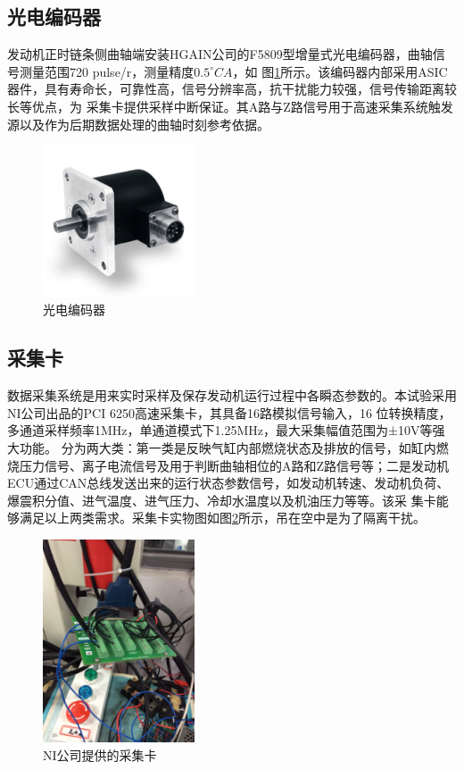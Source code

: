 \subsection{光电编码器}
发动机正时链条侧曲轴端安装HGAIN公司的F5809型增量式光电编码器，曲轴信号测量范围720 pulse/r，测量精度$0.5^{\circ}CA$，如
图\ref{fig:gdbmq}所示。该编码器内部采用ASIC器件，具有寿命长，可靠性高，信号分辨率高，抗干扰能力较强，信号传输距离较长等优点，为
采集卡提供采样中断保证。其A路与Z路信号用于高速采集系统触发源以及作为后期数据处理的曲轴时刻参考依据。
\begin{figure}[H]
	\centering
	\includegraphics[width=0.4\textwidth]{thesis_figure/platformer_chapter/gdbmq}
	\caption{光电编码器}
	\label{fig:gdbmq}
\end{figure}
\subsection{采集卡}
数据采集系统是用来实时采样及保存发动机运行过程中各瞬态参数的。本试验采用NI公司出品的PCI 6250高速采集卡，其具备16路模拟信号输入，16
位转换精度，多通道采样频率1MHz，单通道模式下1.25MHz，最大采集幅值范围为±10V等强大功能。
分为两大类：第一类是反映气缸内部燃烧状态及排放的信号，如缸内燃烧压力信号、离子电流信号及用于判断曲轴相位的A路和Z路信号等；二是发动机
ECU通过CAN总线发送出来的运行状态参数信号，如发动机转速、发动机负荷、爆震积分值、进气温度、进气压力、冷却水温度以及机油压力等等。该采
集卡能够满足以上两类需求。采集卡实物图如图\ref{fig:nicjk}所示，吊在空中是为了隔离干扰。
\begin{figure}[H]
	\centering
	\includegraphics[width=0.4\textwidth]{thesis_figure/platformer_chapter/nicjk}
	\caption{NI公司提供的采集卡}
	\label{fig:nicjk}
\end{figure}
